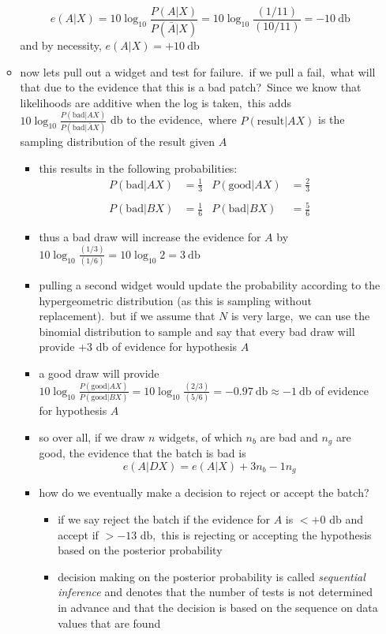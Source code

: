 \documentclass[../jaynes_prob_theory_notes.tex]{subfiles}
\begin{document}
\begin{itemize}
\begin{itemize}
			\begin{equation*}
				e(A|X) = 10\log_{10}\frac{P(A|X)}{P(\bar{A}|X)} = 10\log_{10}\frac{(1/11)}{(10/11)} = -10~\mathrm{db}
			\end{equation*}
			and by necessity, $e(A|X) = +10~\mathrm{db}$
		\item now lets pull out a widget and test for failure.\ if we pull a fail,\ what will that due to the evidence that this is a bad patch?\ Since we know that likelihoods are additive when the log is taken,\ this adds $10\log_{10}\frac{P(\mathrm{bad}|AX)}{P(\mathrm{bad}|\bar{A}X)}$ db to the evidence,\ where $P(\mathrm{result}|AX)$ is the sampling distribution of the result given $A$
			\begin{itemize}
				\item this results in the following probabilities:
					\begin{align*}
						P(\mathrm{bad}|AX) &= \frac{1}{3} & P(\mathrm{good}|AX) &= \frac{2}{3} \\ \\
						P(\mathrm{bad}|BX) &= \frac{1}{6} & P(\mathrm{bad}|BX) &= \frac{5}{6}
					\end{align*}
				\item thus a bad draw will increase the evidence for $A$ by $10\log_{10}\frac{(1/3)}{(1/6)} = 10\log_{10}2 = 3~\mathrm{db}$
				\item pulling a second widget would update the probability according to the hypergeometric distribution (as this is sampling without replacement).\ but if we assume that $N$ is very large,\ we can use the binomial distribution to sample and say that every bad draw will provide +3 db of evidence for hypothesis $A$
				\item a good draw will provide $10\log_{10}\frac{P(\mathrm{good}|AX)}{P(\mathrm{good}|BX)} = 10\log_{10}\frac{(2/3)}{(5/6)} = -0.97~\mathrm{db} \approx -1~\mathrm{db}$ of evidence for hypothesis $A$
				\item so over all, if we draw $n$ widgets, of which $n_b$ are bad and $n_g$ are good, the evidence that the batch is bad is
					\begin{equation*}
						e(A|DX) = e(A|X) + 3n_b - 1n_g
					\end{equation*}
				\item how do we eventually make a decision to reject or accept the batch?
					\begin{itemize}
						\item if we say reject the batch if the evidence for $A$ is $< +0$ db and accept if $> -13$ db,\ this is rejecting or accepting the hypothesis based on the posterior probability
						\item decision making on the posterior probability is called \textit{sequential inference} and denotes that the number of tests is not determined in advance and that the decision is based on the sequence on data values that are found
					\end{itemize}
			\end{itemize}
	\end{itemize}
\end{itemize}
\end{document}
